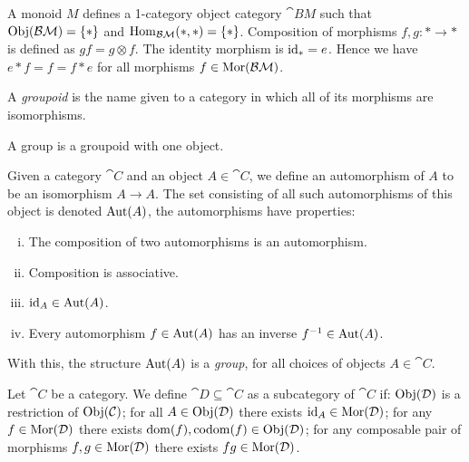 \begin{example}
  A monoid \(M\) defines a 1-category object category \(\cat{BM}\) such that
  \(\operatorname{Obj}(\mathcal{BM}) = \{*\}\) and \(\operatorname{Hom}_{\mathcal{BM}}(*, *) = \{*\}\). Composition
  of morphisms \(f, g: * \to *\) is defined as \(g  f = g \otimes f\). The
  identity morphism is \(\operatorname{id}_* = e\). Hence we have \(e * f = f = f * e\) for
  all morphisms \(f \in \operatorname{Mor}(\mathcal{BM})\).
\end{example}

\begin{definition}[Groupoids]\label{def: groupoids}
  A \emph{groupoid} is the name given to a category in which all of its
  morphisms are isomorphisms.
\end{definition}

\begin{definition}[Group]\label{def: group}
  A group is a groupoid with one object.
\end{definition}

\begin{definition}[Automorphism]
  Given a category \(\cat C\) and an object  \(A \in \cat C\), we define an
  automorphism of \(A\) to be an isomorphism \(A \to A\). The set consisting of
  all such automorphisms of this object is denoted \(\operatorname{Aut}(A)\), the
  automorphisms have properties:
  \begin{enumerate}[i.]
    \item The composition of two automorphisms is an automorphism.
    \item Composition is associative.
    \item \(\operatorname{id}_A \in \operatorname{Aut}(A)\).
    \item Every automorphism \(f \in \operatorname{Aut}(A)\) has an inverse \(f^{-1}
       \in \operatorname{Aut}(A)\).
  \end{enumerate}
  With this, the structure \(\operatorname{Aut}(A)\) is a \emph{group}, for all choices of
  objects \(A \in \cat{C}\).
\end{definition}

\begin{definition}[Subcategory]\label{def: subcategory}
  Let \(\cat C\) be a category. We define \(\cat D \subseteq \cat C\) as a
  subcategory of \(\cat C\) if: \(\operatorname{Obj}(\mathcal D)\) is a restriction of \(\operatorname{Obj}(\mathcal
  C)\); for all \(A \in \operatorname{Obj}(\mathcal D)\) there exists \(\operatorname{id}_A \in \operatorname{Mor}(\mathcal D)\);
  for any \(f \in \operatorname{Mor}(\mathcal D)\) there exists \(\operatorname{dom}(f), \operatorname{codom}(f) \in
  \operatorname{Obj}(\mathcal D)\); for any composable pair of morphisms \(f, g \in \operatorname{Mor}(\mathcal D)\)
  there exists \(f g \in \operatorname{Mor}(\mathcal D)\).
\end{definition}

